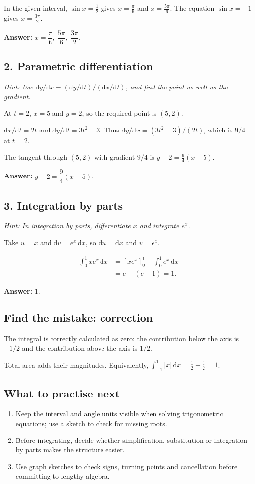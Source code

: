 \documentclass[10pt,a4paper]{article}
\begin{document}
In the given interval, \(\sin x=\tfrac12\) gives \(x=\tfrac\pi6\) and \(x=\tfrac{5\pi}6\). The equation \(\sin x=-1\) gives \(x=\tfrac{3\pi}2\).

\textbf{Answer:} \(x=\dfrac\pi6,\ \dfrac{5\pi}6,\ \dfrac{3\pi}2\).

\subsection*{2. Parametric differentiation}
\textit{Hint: Use \(\mathrm{d}y/\mathrm{d}x=(\mathrm{d}y/\mathrm{d}t)/(\mathrm{d}x/\mathrm{d}t)\), and find the point as well as the gradient.}\par
At \(t=2\), \(x=5\) and \(y=2\), so the required point is \((5,2)\).

\(\mathrm{d}x/\mathrm{d}t=2t\) and \(\mathrm{d}y/\mathrm{d}t=3t^2-3\). Thus \(\mathrm{d}y/\mathrm{d}x=(3t^2-3)/(2t)\), which is \(9/4\) at \(t=2\).

The tangent through \((5,2)\) with gradient \(9/4\) is \(y-2=\tfrac94(x-5)\).

\textbf{Answer:} \(y-2=\dfrac94(x-5)\).

\subsection*{3. Integration by parts}
\textit{Hint: In integration by parts, differentiate \(x\) and integrate \(e^x\).}\par
Take \(u=x\) and \(\mathrm{d}v=e^x\,\mathrm{d}x\), so \(\mathrm{d}u=\mathrm{d}x\) and \(v=e^x\).

\[\begin{aligned}\int_0^1 xe^x\,\mathrm{d}x&=[xe^x]_0^1-\int_0^1e^x\,\mathrm{d}x\\&=e-(e-1)=1.\end{aligned}\]

\textbf{Answer:} \(1\).

\subsection*{Find the mistake: correction}
The integral is correctly calculated as zero: the contribution below the axis is \(-1/2\) and the contribution above the axis is \(1/2\).

Total area adds their magnitudes. Equivalently, \(\int_{-1}^1|x|\,\mathrm{d}x=\tfrac12+\tfrac12=1\).

\subsection*{What to practise next}\begin{enumerate}
\item Keep the interval and angle units visible when solving trigonometric equations; use a sketch to check for missing roots.
\item Before integrating, decide whether simplification, substitution or integration by parts makes the structure easier.
\item Use graph sketches to check signs, turning points and cancellation before committing to lengthy algebra.
\end{enumerate}
\end{document}
